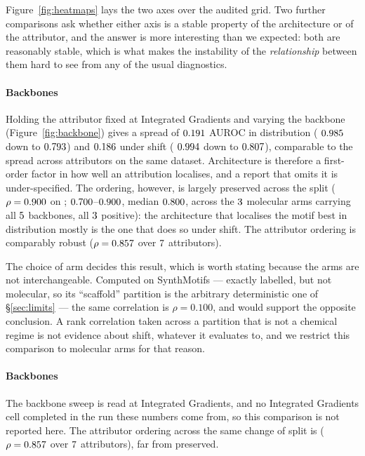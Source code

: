 Figure~\ref{fig:heatmaps} lays the two axes over the audited grid. Two further
comparisons ask whether either axis is a stable property of the architecture or
of the attributor, and the answer is more interesting than we expected: both
are reasonably stable, which is what makes the instability of the
\emph{relationship} between them hard to see from any of the usual diagnostics.

\ifHasBackboneSweep
\paragraph{Backbones} Holding the attributor fixed at Integrated Gradients and
varying the backbone (Figure~\ref{fig:backbone}) gives a spread of
$0.191{}$ AUROC in distribution (\bbIndBest{} $0.985{}$ down to
\bbIndWorst{} $0.793{}$) and $0.186{}$ under shift
(\bbShiftBest{} $0.994{}$ down to \bbShiftWorst{}
$0.807{}$), comparable to the spread across attributors on the same
dataset. Architecture is therefore a first-order factor in how well an
attribution localises, and a report that omits it is under-specified. The
ordering, however, is largely preserved across the split
($\rho=0.900{}$ on \bbDataset{}\ifHasBackboneArms{};
$0.700{}$--$0.900{}$, median $0.800{}$, across the
$3{}$ molecular arms carrying all $5{}$ backbones, all
$3{}$ positive\fi{}): the architecture that localises the motif
best in distribution mostly is the one that does so under shift. The attributor
ordering is comparably robust ($\rho=0.857{}$ over
$7{}$ attributors).

The choice of arm decides this result, which is worth stating because the
arms are not interchangeable. Computed on SynthMotifs --- exactly labelled, but
not molecular, so its ``scaffold'' partition is the arbitrary deterministic one
of \S\ref{sec:limits} --- the same correlation is $\rho=0.100$, and would
support the opposite conclusion. A rank correlation taken across a partition
that is not a chemical regime is not evidence about shift, whatever it
evaluates to, and we restrict this comparison to molecular arms for that
reason.
\else
\paragraph{Backbones} The backbone sweep is read at Integrated Gradients, and
no Integrated Gradients cell completed in the run these numbers come from, so
this comparison is not reported here. The attributor ordering across the same
change of split is ($\rho=0.857{}$ over $7{}$
attributors), far from preserved.
\fi


